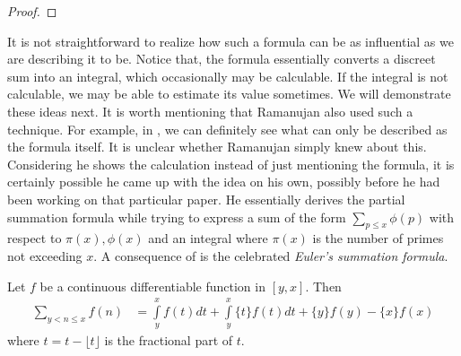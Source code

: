 \documentclass[elemannt.tex]{subfile}
\begin{document}
		\begin{proof}
			
		\end{proof}
	It is not straightforward to realize how such a formula can be as influential as we are describing it to be. Notice that, the formula essentially converts a discreet sum into an integral, which occasionally may be calculable. If the integral is not calculable, we may be able to estimate its value sometimes. We will demonstrate these ideas next. It is worth mentioning that Ramanujan also used such a technique. For example, in \textcite[Page $83$, $\S4$]{aiyangar_hardy_vennkatesvara_seshu_aiyar_p_wilson_1927}, we can definitely see what can only be described as the formula itself. It is unclear whether Ramanujan simply knew about this. Considering he shows the calculation instead of just mentioning the formula, it is certainly possible he came up with the idea on his own, possibly before he had been working on that particular paper. He essentially derives the partial summation formula while trying to express a sum of the form $\sum_{p\leq x}\phi(p)$ with respect to $\pi(x),\phi(x)$ and an integral where $\pi(x)$ is the number of primes not exceeding $x$. A consequence of  is the celebrated \textit{Euler's summation formula}.
		\begin{theorem}\label{thm:eulersum}
			Let $f$ be a continuous differentiable function in $[y,x]$. Then
				\begin{align*}
					\sum_{y<n\leq x}f(n)
						& = \int\limits_{y}^{x}f(t)dt+\int\limits_{y}^{x}\{t\}f(t)dt+\{y\}f(y)-\{x\}f(x)
				\end{align*}
			where ${t}=t-\lfloor{t}\rfloor$ is the fractional part of $t$.
		\end{theorem}
	
\end{document}
